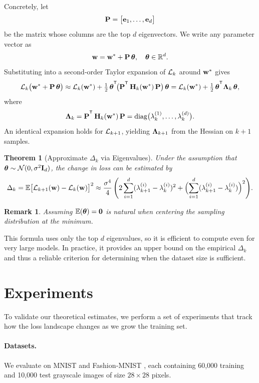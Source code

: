 \documentclass{article}
\newtheorem{theorem}{Theorem} %
\newtheorem{remark}{Remark}
\begin{document}
Concretely, let
$$
  \mathbf{P} =
  \bigl[ \mathbf{e}_1, \dots, \mathbf{e}_d \bigr]
$$
be the matrix whose columns are the top $d$ eigenvectors.  We write any parameter vector as
$$
  \mathbf{w} =
  \mathbf{w}^* + \mathbf{P}\, \boldsymbol{\theta}, \quad
  \boldsymbol{\theta} \in \mathbb R^d.
$$
Substituting into a second‑order Taylor expansion of $\mathcal{L}_k$ around $\mathbf{w}^*$ gives
$$
  \cL_k\bigl(\bw^* + \bP\,\btheta\bigr) \approx
  \cL_k(\bw^*) + \tfrac12\, \btheta^{\T}\! \bigl( \bP^{\T}\, \bH_k(\bw^*)\, \bP\bigr)\, \btheta =
  \cL_k(\bw^*) + \tfrac12\, \btheta^{\T} \bLambda_k\, \btheta,
$$
where
$$
  \bLambda_k =
  \bP^{\T}\, \bH_k(\bw^*)\, \bP =
  \operatorname{diag} \bigl( \lambda_k^{(1)}, \dots, \lambda_k^{(d)} \bigr).
$$
An identical expansion holds for $\mathcal{L}_{k+1}$, yielding $\boldsymbol{\Lambda}_{k+1}$ from the Hessian on $k+1$ samples.

\begin{theorem}[Approximate $\Delta_k$ via Eigenvalues]
  Under the assumption that $\boldsymbol{\theta} \sim \mathcal N(0, \sigma^2 \mathbf I_d)$, the change in loss can be estimated by
  $$
    \Delta_k =
    \mathbb E \bigl[ \mathcal{L}_{k+1}(\mathbf{w}) - \mathcal{L}_k(\mathbf{w}) \bigr]^2 \approx
    \frac{\sigma^4}{4}\, \Biggl( 2 \sum_{i=1}^d (\lambda_{k+1}^{(i)} - \lambda_k^{(i)})^2
    + \Bigl( \sum_{i=1}^d (\lambda_{k+1}^{(i)} - \lambda_k^{(i)}) \Bigr)^2 \Biggr).
  $$
\end{theorem}

\begin{remark}
  Assuming $\mathbb{E}(\boldsymbol{\theta}) = \mathbf{0}$ is natural when centering the sampling distribution at the minimum.
\end{remark}

This formula uses only the top $d$ eigenvalues, so it is efficient to compute even for very large models.
In practice, it provides an upper bound on the empirical $\Delta_k$ and thus a reliable criterion for determining when the
dataset size is sufficient.


\section{Experiments}

To validate our theoretical estimates, we perform a set of experiments that track how the loss landscape changes as we grow the
training set.

\paragraph{Datasets.}
We evaluate on MNIST \cite{deng2012mnist} and Fashion‑MNIST \cite{xiao2017fashion}, each containing 60,000 training and 10,000 test
grayscale images of size $28\times28$ pixels.
\end{document}
